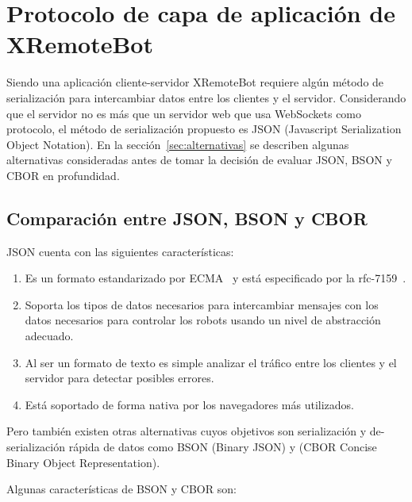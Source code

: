 \chapter{Protocolo de capa de aplicación de XRemoteBot}\label{cha:protocolo}
Siendo una aplicación cliente-servidor XRemoteBot requiere algún método de
serialización para intercambiar datos entre los clientes y el servidor.
Considerando que el servidor no es más que un servidor web que usa WebSockets
como protocolo, el método de serialización propuesto es JSON
(Javascript Serialization Object Notation). En la sección~\ref{sec:alternativas}
se describen algunas alternativas consideradas antes de tomar la decisión de
evaluar JSON, BSON y CBOR en profundidad.

\section{Comparación entre JSON, BSON y CBOR}\label{sec:serializacion}

JSON cuenta con las siguientes características:
\begin{enumerate}
    \item Es un formato estandarizado por ECMA~\citep{ecma-404}
        y está especificado por la rfc-7159~\citep{rfc-7159}.
    \item Soporta los tipos de datos necesarios para intercambiar mensajes con
        los datos necesarios para controlar los robots usando un nivel de
        abstracción adecuado.
    \item Al ser un formato de texto es simple analizar el tráfico entre los
        clientes y el servidor para detectar posibles errores.
    \item Está soportado de forma nativa por los navegadores más
        utilizados.%
\end{enumerate}

Pero también existen otras alternativas cuyos objetivos son serialización
y de-serialización rápida de datos
como BSON (Binary JSON) y (CBOR Concise Binary Object Representation).

Algunas características de BSON y CBOR son:

